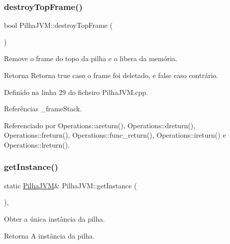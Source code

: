 \mbox{\label{classPilhaJVM_a8ae0ed77b894fa95e73ea4077ebdeea2}} 
\subsubsection{\texorpdfstring{destroy\+Top\+Frame()}{destroyTopFrame()}}
{\footnotesize\ttfamily bool Pilha\+J\+V\+M\+::destroy\+Top\+Frame (\begin{DoxyParamCaption}{ }\end{DoxyParamCaption})}



Remove o frame do topo da pilha e o libera da memória. 

\begin{DoxyReturn}{Retorna}
Retorna {\ttfamily true} caso o frame foi deletado, e {\ttfamily false} caso contrário. 
\end{DoxyReturn}


Definido na linha 29 do ficheiro Pilha\+J\+V\+M.\+cpp.



Referências \+\_\+frame\+Stack.



Referenciado por Operations\+::areturn(), Operations\+::dreturn(), Operations\+::freturn(), Operations\+::func\+\_\+return(), Operations\+::ireturn() e Operations\+::lreturn().

\mbox{\label{classPilhaJVM_a13bf1c43de7819ea7761616f7a04c3b9}} 
\subsubsection{\texorpdfstring{get\+Instance()}{getInstance()}}
{\footnotesize\ttfamily static \hyperlink{classPilhaJVM}{Pilha\+J\+VM}\& Pilha\+J\+V\+M\+::get\+Instance (\begin{DoxyParamCaption}{ }\end{DoxyParamCaption})\hspace{0.3cm}{\ttfamily [inline]}, {\ttfamily [static]}}



Obter a única instância da pilha. 

\begin{DoxyReturn}{Retorna}
A instância da pilha. 
\end{DoxyReturn}


